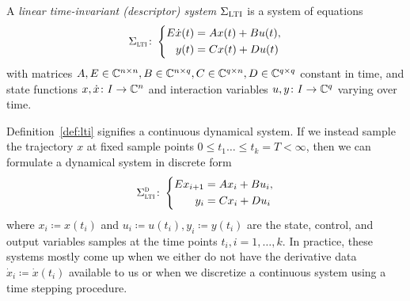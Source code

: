 \begin{definition}\label{def:lti}
    A \emph{linear time-invariant (descriptor) system} $\Sigma_{\textsc{LTI}}$ is a system of equations
    \begin{equation}\label{eq:lti}
        \Sigma_{\textsc{lti}} \colon \left\lbrace
        \begin{aligned}
            E \dot{x}(t) &= A x(t) + B u(t), \\
            y(t) &= C x(t) + D u(t)
        \end{aligned}
        \right.
    \end{equation}
    with matrices $A, E \in \mathbb{C}^{n \times n}, B \in \mathbb{C}^{n \times q}, C \in \mathbb{C}^{q \times n}, D \in \mathbb{C}^{q \times q}$ constant in time, and state functions $x, \dot{x} \colon I \to \mathbb{C}^n$ and interaction variables $u, y \colon I \to \mathbb{C}^q$ varying over time.
\end{definition}

\begin{remark}
    Definition~\ref{def:lti} signifies a continuous dynamical system.
    If we instead sample the trajectory $x$ at fixed sample points $0 \leq t_1 \dots \leq t_k = T < \infty$, then we can formulate a dynamical system in discrete form
    \begin{equation*}
        \Sigma_{\textsc{lti}}^{\textsc{d}} \colon \left\lbrace
        \begin{aligned}
            E x_{i + 1} &= A x_i + B u_i, \\
            y_i &= C x_i + D u_i
        \end{aligned}
        \right.
    \end{equation*}
    where $x_i \coloneqq x(t_i)$ and $u_i \coloneqq u(t_i), y_i \coloneqq y(t_i)$ are the state, control, and output variables samples at the time points $t_i, i = 1, \dots, k$.
    In practice, these systems mostly come up when we either do not have the derivative data $\dot{x}_i \coloneqq \dot{x}(t_i)$ available to us or when we discretize a continuous system using a time stepping procedure.
\end{remark}

